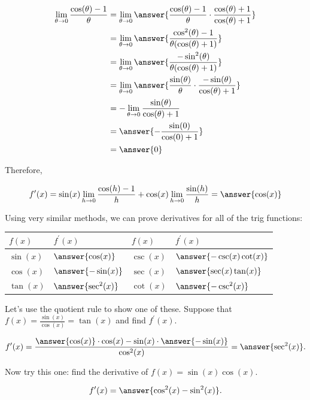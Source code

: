 \documentclass{ximera}
\begin{document}
\[
\begin{aligned}
\lim _{\theta \rightarrow 0} \frac{\cos (\theta)-1}{\theta} & = \lim _{\theta \rightarrow 0} \answer{\frac{\cos(\theta)-1}{\theta}\cdot\frac{\cos(\theta)+1}{\cos(\theta)+1}} \\
& = \lim _{\theta \rightarrow 0} \answer{\frac{\cos^2(\theta)-1}{\theta(\cos(\theta)+1)}} \\
& = \lim _{\theta \rightarrow 0} \answer{\frac{-\sin^2(\theta)}{\theta(\cos(\theta)+1)}} \\
& = \lim _{\theta \rightarrow 0} \answer{\frac{\sin(\theta)}{\theta}\cdot\frac{-\sin(\theta)}{\cos(\theta)+1}} \\
& =-\lim _{\theta \rightarrow 0} \frac{\sin (\theta)}{\cos (\theta)+1} \\
& = \answer{-\frac{\sin(0)}{\cos(0)+1}} \\
& = \answer{0}
\end{aligned}
\]

Therefore,

\[
f^{\prime}(x)=\sin (x) \lim _{h \rightarrow 0} \frac{\cos (h)-1}{h}+\cos (x) \lim _{h \rightarrow 0} \frac{\sin (h)}{h}=\answer{\cos(x)}
\]

Using very similar methods, we can prove derivatives for all of the trig functions:

\begin{center}
\begin{tabular}[t]{|l|l|l|l|}
\hline
$f(x)$ & $f^{\prime}(x)$ & $f(x)$ & $f^{\prime}(x)$ \\
\hline
$\sin (x)$ & $\answer{\cos(x)}$ & $\csc (x)$ & $\answer{-\csc(x)\cot(x)}$ \\
\hline
$\cos (x)$ & $\answer{-\sin(x)}$ & $\sec (x)$ & $\answer{\sec(x)\tan(x)}$ \\
\hline
$\tan (x)$ & $\answer{\sec^2(x)}$ & $\cot (x)$ & $\answer{-\csc^2(x)}$ \\
\hline
\end{tabular}
\end{center}

\begin{example}
\label{example:6-1}
Let's use the quotient rule to show one of these. Suppose that $f(x)=\frac{\sin (x)}{\cos (x)}=\tan (x)$ and find $f^{\prime}(x)$.

\[
f^{\prime}(x)=\frac{\answer{\cos(x)}\cdot\cos(x)-\sin(x)\cdot\answer{-\sin(x)}}{\cos^{2}(x)}=\answer{\sec^2(x)}.
\]
\end{example}

\begin{exercise}
\label{exercise:6-2}
Now try this one: find the derivative of $f(x)=\sin (x) \cos (x)$.

\[
f^{\prime}(x)=\answer{\cos^2(x)-\sin^2(x)}.
\]
\end{exercise}
\end{document}
